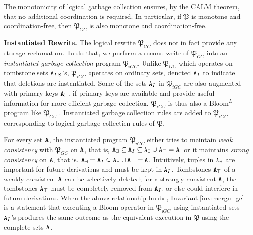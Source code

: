 The monotonicity of logical garbage collection ensures, by the CALM theorem, that no additional coordination is required.
In particular, if $\mathfrak{P}$ is monotone and coordination-free, then $\mathfrak{P}_{GC}$ is also monotone and coordination-free.


\textbf{Instantiated Rewrite.}
The logical rewrite $\mathfrak{P}_{GC}$ does not in fact provide any storage reclamation.
To do that, we perform a second write of $\mathfrak{P}_{GC}$ into an \emph{instantiated garbage collection} program $\mathfrak{P}_{iGC}$.
Unlike $\mathfrak{P}_{GC}$ which operates on tombstone sets $\tt{A}_{TS}$'s, $\mathfrak{P}_{iGC}$ operates on ordinary sets, denoted $\tt{A}_I$ to indicate that deletions are instantiated.
Some of the sets $\tt{A}_I$ in $\mathfrak{P}_{iGC}$ are also augmented with primary keys $\tt{A}_!$ , if primary keys are available and provide useful information for more efficient garbage collection.
$\mathfrak{P}_{iGC}$ is thus also a Bloom$^L$ program like $\mathfrak{P}_{GC}$ .
Instantiated garbage collection rules are added to $\mathfrak{P}_{iGC}$ corresponding to logical garbage collection rules of $\mathfrak{P}$.

For every set $\tt{A}$, the instantiated program $\mathfrak{P}_{iGC}$ either tries to  maintain \emph{weak consistency}  with $\mathfrak{P}_{GC}$ on $\tt{A}$, that is,
$\tt{A}_\exists \subseteq \tt{A}_I \subseteq \tt{A}_\exists \cup \tt{A}_\top = \tt{A}$,
or it maintains \emph{strong consistency}  on $\tt{A}$, that is,
$\tt{A}_\exists = \tt{A}_I \subseteq \tt{A}_\exists \cup \tt{A}_\top = \tt{A}$.
Intuitively, tuples in $\tt{A}_\exists$ are important for future derivations and must be kept in $\tt{A}_I$.
Tombstones $\tt{A}_\top$ of a weakly consistent $\tt{A}$ can be selectively deleted; for a strongly consistent $\tt{A}$, the tombstones $\tt{A}_\top$ must be completely removed from $\tt{A}_I$, or else could interfere in future derivations.
When the above relationship holds , Invariant \ref{inv:merge_gc} is a statement that executing a Bloom operator in $\mathfrak{P}_{iGC}$ using instantiated sets $\tt{A}_I$'s produces the same outcome as the equivalent execution in $\mathfrak{P}$ using the complete sets $\tt{A}$. 

